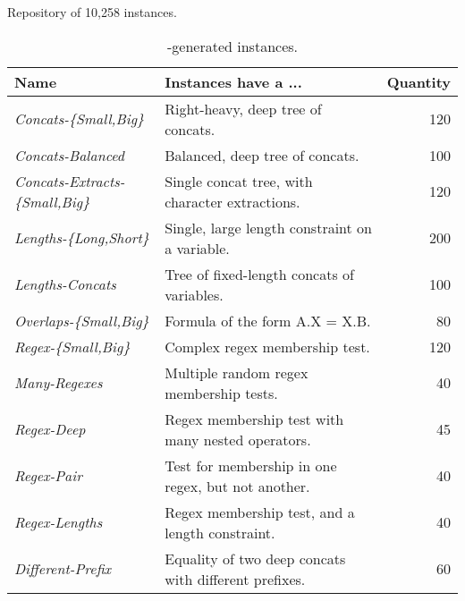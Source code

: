 \begin{table}[t]
    \caption{Repository of 10,258 \smtfull{} instances.}
    \begin{subtable}{1\textwidth}
        \centering
        \caption{\generator{}-generated instances.}
        \label{tbl:generated}
        \begin{tabular}{llr}
            \toprule
            \textbf{Name}
                & \textbf{Instances have a ...}
                & \textbf{Quantity}
            \\
            \midrule
            \textit{Concats-\{Small,Big\}}
                & Right-heavy, deep tree of concats.
                & 120 \\
            \textit{Concats-Balanced}
                & Balanced, deep tree of concats.
                & 100 \\
            \textit{Concats-Extracts-\{Small,Big\}}
                & Single concat tree, with character extractions.
                & 120 \\
            \textit{Lengths-\{Long,Short\}}
                & Single, large length constraint on a variable.
                & 200 \\
            \textit{Lengths-Concats}
                & Tree of fixed-length concats of variables.
                & 100 \\
            \textit{Overlaps-\{Small,Big\}}
                & Formula of the form A.X = X.B.
                & 80 \\
            \textit{Regex-\{Small,Big\}}
                & Complex regex membership test.
                & 120 \\
            \textit{Many-Regexes}
                & Multiple random regex membership tests.
                & 40 \\
            \textit{Regex-Deep}
                & Regex membership test with many nested operators.
                & 45 \\
            \textit{Regex-Pair}
                & Test for membership in one regex, but not another.
                & 40 \\
            \textit{Regex-Lengths}
                & Regex membership test, and a length constraint.
                & 40 \\
            \textit{Different-Prefix}
                & Equality of two deep concats with different prefixes.
                & 60 \\
            \bottomrule
        \end{tabular}
    \end{subtable}


\end{table}
